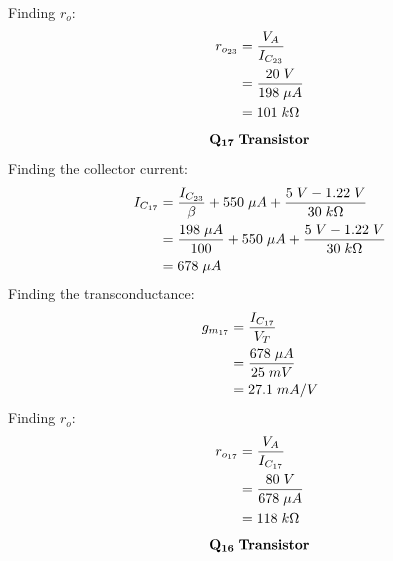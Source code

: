 \documentclass{article}
\begin{document}
	Finding $r_o$:
	\begin{align*}
		r_{o_{23}} &= \frac{V_A}{I_{C_{23}}}\\
		&= \frac{20 \hspace{1mm} V}{198 \hspace{1mm} \mu A}\\
		&= 101 \hspace{1mm} k\Omega
	\end{align*}
	\begin{align*}
		\mathbf{Q_{17}} \hspace{1mm} \textbf{Transistor}
	\end{align*}
	Finding the collector current:
	\begin{align*}
		I_{C_{17}} &= \frac{I_{C_{23}}}{\beta} + 550 \hspace{1mm}\mu A + \frac{5 \hspace{1mm} V - 1.22 \hspace{1mm} V}{30 \hspace{1mm} k\Omega}\\ 
		&= \frac{198 \hspace{1mm} \mu A}{100} + 550 \hspace{1mm}\mu A + \frac{5 \hspace{1mm} V - 1.22 \hspace{1mm} V}{30 \hspace{1mm} k\Omega}\\ 
		&= 678 \hspace{1mm} \mu A
	\end{align*}
	Finding the transconductance:
	\begin{align*}
		g_{m_{17}} &= \frac{I_{C_{17}}}{V_T}\\
		&= \frac{678 \hspace{1mm} \mu A}{25 \hspace{1mm} mV}\\
		&= 27.1 \hspace{1mm} mA/V
	\end{align*}
	Finding $r_o$:
	\begin{align*}
		r_{o_{17}} &= \frac{V_A}{I_{C_{17}}}\\
		&= \frac{80 \hspace{1mm} V}{678 \hspace{1mm} \mu A}\\
		&= 118 \hspace{1mm} k\Omega
	\end{align*}
	\pagebreak
	\begin{align*}
		\mathbf{Q_{16}} \hspace{1mm} \textbf{Transistor}
	\end{align*}
\end{document}
